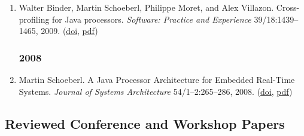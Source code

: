 \begin{enumerate}
\item Walter Binder, Martin Schoeberl, Philippe Moret, and Alex Villazon.
 Cross-profiling for Java processors.
 \emph{Software: Practice and Experience} 39/18:1439--1465, 2009.
(\href{http://dx.doi.org/10.1002/spe.940}{doi}, \href{http://www.jopdesign.com/doc/cprof_spe.pdf}{pdf})


\subsubsection*{2008}

\item Martin Schoeberl.
 A Java Processor Architecture for Embedded Real-Time Systems.
 \emph{Journal of Systems Architecture} 54/1--2:265--286, 2008.
(\href{http://dx.doi.org/http://dx.doi.org/10.1016/j.sysarc.2007.06.001}{doi}, \href{http://www.jopdesign.com/doc/rtarch.pdf}{pdf})


\end{enumerate}

\subsection*{Reviewed Conference and Workshop Papers}

